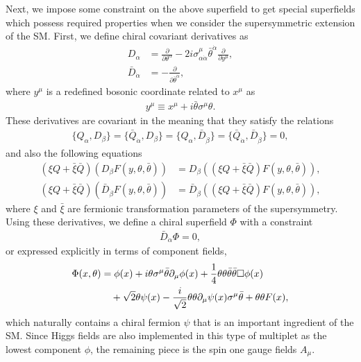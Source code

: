 \documentclass[12pt,twoside,book]{article}
\begin{document}
Next, we impose some constraint on the above superfield to get special superfields which possess required properties when we consider the supersymmetric extension of the SM.
First, we define chiral covariant derivatives as
\begin{align}
  D_\alpha &= \frac{\partial}{\partial \theta^\alpha} -
  2i\sigma^\mu_{\alpha \dot{\alpha}} \bar{\theta}^{\dot{\alpha}}
  \frac{\partial}{\partial y^\mu}, \\
  \bar{D}_{\dot{\alpha}} &= - \frac{\partial}{\partial \bar{\theta}^{\dot{\alpha}}},
\end{align}
where $y^\mu$ is a redefined bosonic coordinate related to $x^\mu$ as
\begin{align}
  y^\mu \equiv x^\mu + i\bar{\theta} \sigma^\mu \theta.
\end{align}
These derivatives are covariant in the meaning that they satisfy the relations
\begin{align}
  \{ Q_\alpha, D_\beta \} = \{ \bar{Q}_{\dot{\alpha}}, D_\beta \} = \{
  Q_\alpha, \bar{D}_{\dot{\beta}} \} = \{ \bar{Q}_{\dot{\alpha}},
  \bar{D}_{\dot{\beta}} \} = 0,
\end{align}
and also the following equations
\begin{align}
  (\xi Q + \bar{\xi} \bar{Q}) (D_\beta F(y,\theta,\bar{\theta})) &=
  D_\beta ((\xi Q + \bar{\xi} \bar{Q}) F(y,\theta,\bar{\theta})), \\
  (\xi Q + \bar{\xi} \bar{Q}) (\bar{D}_{\dot{\beta}}
  F(y,\theta,\bar{\theta})) &= \bar{D}_{\dot{\beta}} ((\xi Q +
  \bar{\xi} \bar{Q}) F(y,\theta,\bar{\theta})),
\end{align}
where $\xi$ and $\bar{\xi}$ are fermionic transformation parameters of the supersymmetry.
Using these derivatives, we define a chiral superfield $\Phi$ with a constraint
\begin{align}
  \bar{D}_{\dot{\alpha}} \Phi = 0,
\end{align}
or expressed explicitly in terms of component fields,
\begin{align}
  \Phi(x,\theta) &=  \phi(x) + i\theta \sigma^\mu \bar{\theta} \partial_\mu \phi(x) +
  \frac{1}{4} \theta\theta\bar{\theta}\bar{\theta} \Box \phi(x) \notag \\
  &\quad + \sqrt{2} \theta \psi(x) - \frac{i}{\sqrt{2}} \theta\theta
  \partial_\mu \psi(x) \sigma^\mu \bar{\theta} + \theta\theta F(x),\label{chiralsuperf}
\end{align}
which naturally contains a chiral fermion $\psi$ that is an important ingredient of the SM.
Since Higgs fields are also implemented in this type of multiplet as the lowest component $\phi$, the remaining piece is the spin one gauge fields $A_\mu$.
\end{document}
